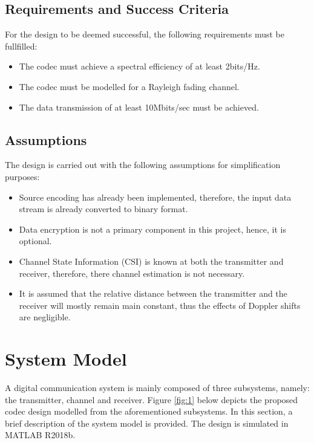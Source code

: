 \documentclass[pdftex,11pt,a4paper]{article}
\begin{document}
\subsection{Requirements and Success Criteria}
For the design to be deemed successful, the following requirements must be fullfilled:

\begin{itemize}
    \item The codec must achieve a spectral efficiency of at least 2bits/Hz.
    \item The codec must be modelled for a Rayleigh fading channel.
    \item The data transmission of at least 10Mbits/sec must be achieved. 
\end{itemize}{}

\subsection{Assumptions}
The design is carried out with the following assumptions for simplification purposes:

\begin{itemize}
    \item Source encoding has already been implemented, therefore, the input data stream is already converted to binary format.
    \item Data encryption is not a primary component in this project, hence, it is optional.
    \item Channel State Information (CSI) is known at both the transmitter and receiver, therefore, there channel estimation is not necessary.
    \item It is assumed that the relative distance between the transmitter and the receiver will mostly remain main constant, thus the effects of Doppler shifts are negligible. 
\end{itemize}{}

\section{System Model}
A digital communication system  is mainly composed of three subsystems, namely: the transmitter, channel and receiver. Figure \ref{fig:1} below depicts the proposed codec design modelled from the aforementioned subsystems. In this section, a brief description of the system model is provided. The design is simulated in MATLAB R2018b.
\end{document}
